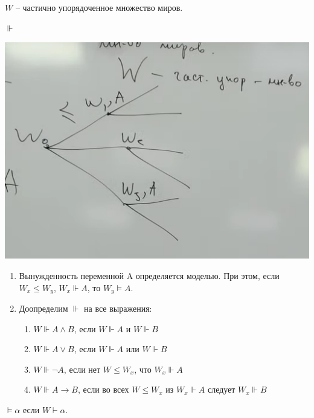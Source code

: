     \begin{note}
        $W$ -- частично упорядоченное множество миров.
    \end{note}

    \begin{definition}
        $\Vdash$

\includegraphics[]{img/forced_variable_worlds}

        \begin{enumerate}
            \item Вынужденность переменной A определяется моделью. При этом, если $W_x \leqslant W_y$, $ W_x\Vdash A$, то $W_y \vDash A$.
            \item Доопределим $\Vdash$ на все выражения:
            \begin{enumerate}
                \item $W \Vdash A\land B$, если $W \Vdash A$ и $W \Vdash B$
                \item $W \Vdash A\lor B$, если $W \Vdash A$ или $W \Vdash B$
                \item $W \Vdash \neg A$, если нет $W \leqslant W_x$, что $W_x \Vdash A$
                \item $W \Vdash A \to B$, если во всех $W \leqslant W_x $ из $W_x \Vdash A$ следует $W_x \Vdash B$
            \end{enumerate}
        \end{enumerate}
    \end{definition}

    \begin{definition}
        $\vDash \alpha$ если $W \vdash \alpha$.
    \end{definition}

